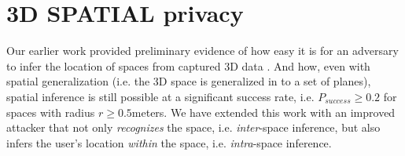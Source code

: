 \section{3D SPATIAL privacy}

Our earlier work provided preliminary evidence of how easy it is for an adversary to infer the location of spaces from captured 3D data \cite{deguzman2019firstlook}. And how, even with spatial generalization (i.e. the 3D space is generalized in to a set of planes), spatial inference is still possible at a significant success rate, i.e. $P_{success}\geq0.2$ for spaces with radius $r\geq 0.5$meters. We have extended this work with an improved attacker that not only \textit{recognizes} the space, i.e. \textit{inter}-space inference, but also infers the user's location \textit{within} the space, i.e. \textit{intra}-space inference. %


